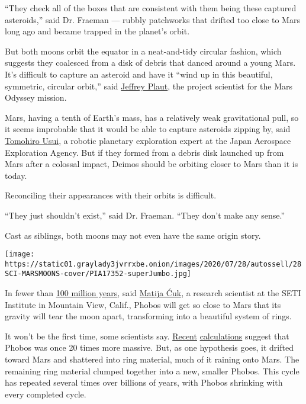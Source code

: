``They check all of the boxes that are consistent with them being these
captured asteroids,'' said Dr. Fraeman --- rubbly patchworks that
drifted too close to Mars long ago and became trapped in the planet's
orbit.

But both moons orbit the equator in a neat-and-tidy circular fashion,
which suggests they coalesced from a disk of debris that danced around a
young Mars. It's difficult to capture an asteroid and have it ``wind up
in this beautiful, symmetric, circular orbit,'' said
\href{https://science.jpl.nasa.gov/people/Plaut/}{Jeffrey Plaut}, the
project scientist for the Mars Odyssey mission.

Mars, having a tenth of Earth's mass, has a relatively weak
gravitational pull, so it seems improbable that it would be able to
capture asteroids zipping by, said
\href{https://planetb.sci.isas.jaxa.jp/aqua/pages/people.html}{Tomohiro
Usui}, a robotic planetary exploration expert at the Japan Aerospace
Exploration Agency. But if they formed from a debris disk launched up
from Mars after a colossal impact, Deimos should be orbiting closer to
Mars than it is today.

Reconciling their appearances with their orbits is difficult.

``They just shouldn't exist,'' said Dr. Fraeman. ``They don't make any
sense.''

Cast as siblings, both moons may not even have the same origin story.

\texttt{[image: https://static01.graylady3jvrrxbe.onion/images/2020/07/28/autossell/28SCI-MARSMOONS-cover/PIA17352-superJumbo.jpg]}

In fewer than
\href{https://sci.esa.int/web/mars-express/-/31031-phobos}{100 million
years}, said
\href{https://www.seti.org/our-scientists/matija-cuk}{Matija Ćuk}, a
research scientist at the SETI Institute in Mountain View, Calif.,
Phobos will get so close to Mars that its gravity will tear the moon
apart, transforming into a beautiful system of rings.

It won't be the first time, some scientists say.
\href{https://www.nature.com/articles/ngeo2916}{Recent}
\href{https://iopscience.iop.org/article/10.3847/2041-8213/ab974f}{calculations}
suggest that Phobos was once 20 times more massive. But, as one
hypothesis goes, it drifted toward Mars and shattered into ring
material, much of it raining onto Mars. The remaining ring material
clumped together into a new, smaller Phobos. This cycle has repeated
several times over billions of years, with Phobos shrinking with every
completed cycle.

